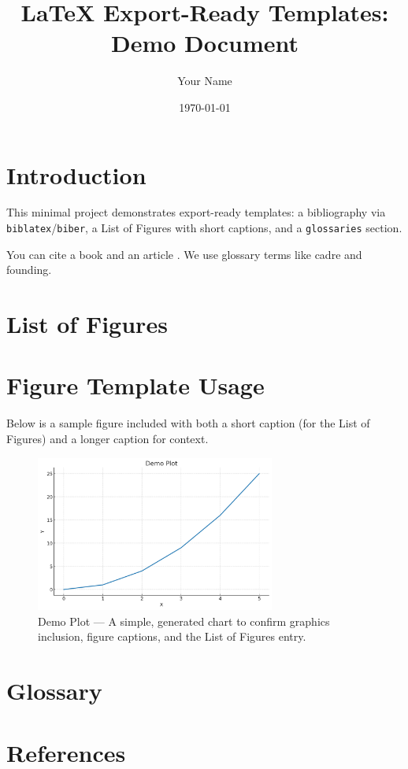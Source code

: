 \documentclass[12pt]{article}
\title{LaTeX Export-Ready Templates: Demo Document}
\author{Your Name}
\date{\today}
\begin{document}
\maketitle
\tableofcontents

\section{Introduction}
This minimal project demonstrates export-ready templates:
a bibliography via \texttt{biblatex}/\texttt{biber}, a List of Figures with short captions,
and a \texttt{glossaries} section.

You can cite a book \parencite{chernow1998titan} and an article \parencite{smith2020wealth}.
We use glossary terms like \gls{cadre} and \gls{founding}.

\section{List of Figures}
\listoffigures

\section{Figure Template Usage}
Below is a sample figure included with both a short caption (for the List of Figures) and a longer caption for context.
\begin{figure}[h]
  \centering
  \includegraphics[width=0.7\textwidth]{figure.png}
  \caption[Demo Plot]{Demo Plot --- A simple, generated chart to confirm graphics inclusion, figure captions, and the List of Figures entry.}
  \label{fig:demo}
\end{figure}

\section{Glossary}
\glsaddall
\printglossaries

\section{References}
\printbibliography
\end{document}
